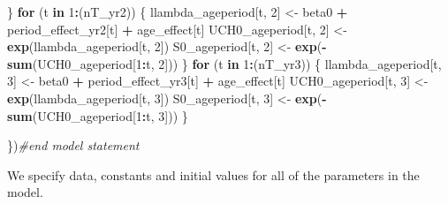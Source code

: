 \documentclass[11pt,]{article}
\newenvironment{Shaded}{\begin{snugshade}}{\end{snugshade}}
\newcommand{\KeywordTok}[1]{\textcolor[rgb]{0.13,0.29,0.53}{\textbf{#1}}}
\newcommand{\DecValTok}[1]{\textcolor[rgb]{0.00,0.00,0.81}{#1}}
\newcommand{\StringTok}[1]{\textcolor[rgb]{0.31,0.60,0.02}{#1}}
\newcommand{\CommentTok}[1]{\textcolor[rgb]{0.56,0.35,0.01}{\textit{#1}}}
\newcommand{\ControlFlowTok}[1]{\textcolor[rgb]{0.13,0.29,0.53}{\textbf{#1}}}
\newcommand{\OperatorTok}[1]{\textcolor[rgb]{0.81,0.36,0.00}{\textbf{#1}}}
\newcommand{\NormalTok}[1]{#1}
\begin{document}
\begin{Shaded}
\begin{Highlighting}[]
\NormalTok{  \}}
  \ControlFlowTok{for}\NormalTok{ (t }\ControlFlowTok{in} \DecValTok{1}\OperatorTok{:}\NormalTok{(nT_yr2)) \{}
\NormalTok{    llambda_ageperiod[t, }\DecValTok{2}\NormalTok{] <-}\StringTok{ }\NormalTok{beta0 }\OperatorTok{+}\StringTok{ }\NormalTok{period_effect_yr2[t] }\OperatorTok{+}\StringTok{ }\NormalTok{age_effect[t]}
\NormalTok{    UCH0_ageperiod[t, }\DecValTok{2}\NormalTok{] <-}\StringTok{ }\KeywordTok{exp}\NormalTok{(llambda_ageperiod[t, }\DecValTok{2}\NormalTok{])}
\NormalTok{    S0_ageperiod[t, }\DecValTok{2}\NormalTok{] <-}\StringTok{ }\KeywordTok{exp}\NormalTok{(}\OperatorTok{-}\KeywordTok{sum}\NormalTok{(UCH0_ageperiod[}\DecValTok{1}\OperatorTok{:}\NormalTok{t, }\DecValTok{2}\NormalTok{]))}
\NormalTok{  \}}
  \ControlFlowTok{for}\NormalTok{ (t }\ControlFlowTok{in} \DecValTok{1}\OperatorTok{:}\NormalTok{(nT_yr3)) \{}
\NormalTok{    llambda_ageperiod[t, }\DecValTok{3}\NormalTok{] <-}\StringTok{ }\NormalTok{beta0 }\OperatorTok{+}\StringTok{ }\NormalTok{period_effect_yr3[t] }\OperatorTok{+}\StringTok{ }\NormalTok{age_effect[t]}
\NormalTok{    UCH0_ageperiod[t, }\DecValTok{3}\NormalTok{] <-}\StringTok{ }\KeywordTok{exp}\NormalTok{(llambda_ageperiod[t, }\DecValTok{3}\NormalTok{])}
\NormalTok{    S0_ageperiod[t, }\DecValTok{3}\NormalTok{] <-}\StringTok{ }\KeywordTok{exp}\NormalTok{(}\OperatorTok{-}\KeywordTok{sum}\NormalTok{(UCH0_ageperiod[}\DecValTok{1}\OperatorTok{:}\NormalTok{t, }\DecValTok{3}\NormalTok{]))}
\NormalTok{  \}}

\NormalTok{\})}\CommentTok{#end model statement}
\end{Highlighting}
\end{Shaded}

We specify data, constants and initial values for all of the parameters
in the model.
\end{document}
